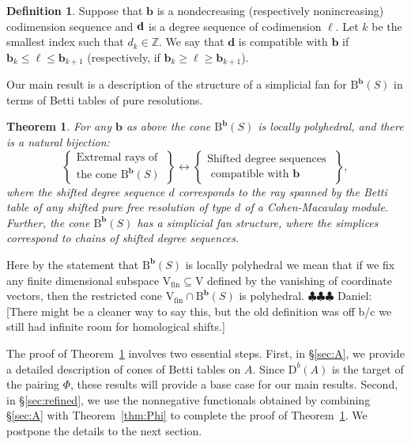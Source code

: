 \documentclass[12pt]{amsart}
\newtheorem{thm}[lemma]{Theorem}
\theoremstyle{definition}
\newtheorem{defn}[lemma]{Definition}
\theoremstyle{remark}
\newcommand{\ZZ}{\mathbb{Z}}
\newcommand{\VV}{\mathrm{V}}
\newcommand{\bb}{\mathbf{b}}
\newcommand{\dd}{\mathbf{d}}
\newcommand{\defi}[1]{\textsf{#1}} %
\newcommand{\DD}{\mathrm{D}}
\newcommand{\BBQ}{\mathrm{B}}
\newcommand{\daniel}[1]{{\color{green} \sf $\clubsuit\clubsuit\clubsuit$ Daniel: [#1]}}
\begin{document}
\begin{defn}\label{defn:deg compatible}
Suppose that $\bb$ is a nondecreasing (respectively nonincreasing) codimension sequence 
and ${\bf d}$ is a degree sequence  of codimension $\ell$. Let $k$ be the smallest index
such that $d_{k}\in \ZZ$. We say that $\dd$ is \defi{compatible with $\bb$} if $\bb_k\leq \ell\leq \bb_{k+1}$  (respectively, if $\bb_k\geq \ell\geq \bb_{k+1}$).
\end{defn}

Our main result is a description of the structure of a simplicial fan for $\BBQ^{\bb}(S)$ in terms of  Betti tables of pure resolutions.  

\begin{thm}\label{thm:extremal rays refined}
For any $\bb$ as above the cone $\BBQ^{\bb}(S)$ is locally polyhedral, and there is a natural bijection:
\[
\left\{
\begin{matrix}
\text{Extremal rays of }\\
\text{the cone } \BBQ^{\bb}(S)
\end{matrix}
\right\}
\longleftrightarrow
\left\{
\begin{matrix}
\text{Shifted degree sequences }\\
\text{ compatible with $\bb$}
\end{matrix}
\right\},
\]
where the shifted degree sequence $d$ corresponds to the ray spanned by 
the Betti table of any shifted pure free resolution of type $d$ of a Cohen-Macaulay module. Further, the cone $\BBQ^{\bb}(S)$ has a simplicial fan structure, where the simplices correspond to chains of shifted degree sequences.
\end{thm}

Here by the statement that $\BBQ^{\bb}(S)$ is \defi{locally polyhedral} we mean that if we fix any finite dimensional subspace $\VV_{\text{fin}}\subseteq \VV$ defined by the vanishing of coordinate vectors, then the restricted cone $\VV_{\text{fin}}\cap \BBQ^{\bb}(S)$ is polyhedral.  \daniel{There might be a cleaner way to say this, but the old definition was off b/c we still had infinite room for homological shifts.}

The proof of Theorem~\ref{thm:extremal rays refined} involves two essential steps.  First, in \S\ref{sec:A}, we provide a detailed description of cones of Betti tables on $A$.  Since $\DD^b(A)$ is the target of the pairing $\Phi$, these results will provide a base case for our main results.  Second, in \S\ref{sec:refined}, 
we use the nonnegative functionals obtained by combining  \S\ref{sec:A} with Theorem~\ref{thm:Phi} to complete the proof of Theorem~\ref{thm:extremal rays refined}. We postpone the details to the next section.
\end{document}
